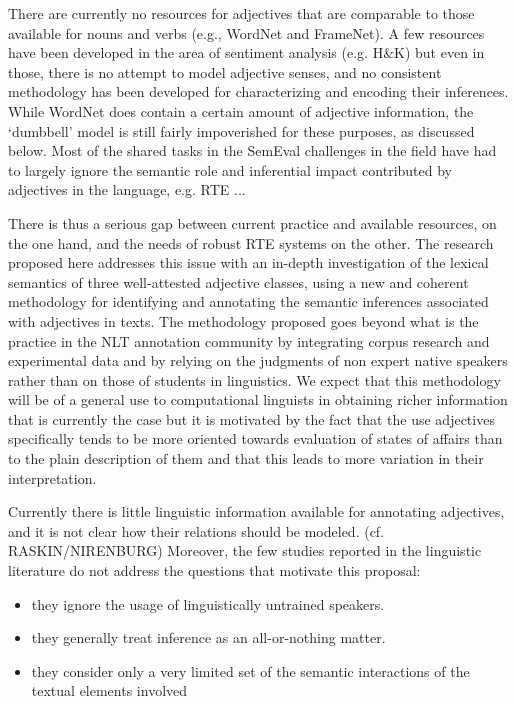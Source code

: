 \documentclass[10pt]{article}
\newcommand{\moveup}{\vspace*{-1.8mm}}
\begin{document}
There are currently no resources for adjectives that are comparable to those available for nouns and verbs (e.g., WordNet and FrameNet). A few resources have been developed in the area of sentiment analysis (e.g. H\&K) but even in those, there is no attempt to model adjective senses, and no consistent methodology has been developed for characterizing and encoding their inferences. While WordNet does contain a certain amount of adjective information, the `dumbbell' model is still fairly impoverished for these purposes, as discussed below. Most of the shared tasks in the SemEval challenges in the field have had to largely ignore the semantic role and inferential impact contributed by adjectives in the language, e.g. RTE ...

There is thus a serious gap between current practice and available resources, on the one hand, and the needs of robust RTE systems on the other. The research proposed here addresses this issue with an in-depth investigation of the lexical semantics of three well-attested adjective classes, using a new and coherent methodology for identifying and annotating the semantic inferences associated with adjectives in texts. The methodology proposed goes beyond what is the practice in the NLT annotation community by integrating corpus research and experimental data and by relying on the judgments of non expert native speakers rather than on those of students in linguistics. We expect that this methodology will be of a general use to computational linguists in obtaining richer information that is currently the case but it is motivated by the fact that the use adjectives specifically tends to be more oriented towards evaluation of states of affairs than to the plain description of them and that this leads to more variation in their interpretation. 


Currently there is little linguistic information available for annotating adjectives, and it is not clear how their relations should be modeled. (cf. RASKIN/NIRENBURG)
Moreover, the few studies reported in the linguistic literature do not address the questions that motivate this proposal: 
\begin{itemize}
\moveup
\item they ignore the usage of linguistically untrained speakers. 
\moveup
\item they generally treat inference as an all-or-nothing matter. 
\moveup
\item they consider only a very limited set of the semantic interactions of the textual elements involved
\moveup
\end{itemize}
\end{document}

